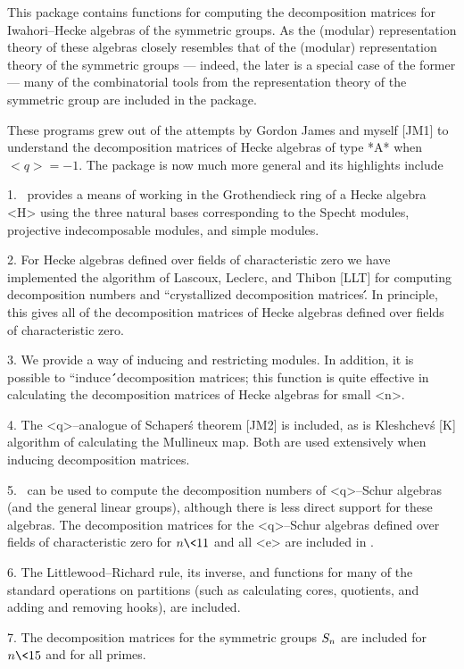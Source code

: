 This package contains functions for computing the decomposition matrices 
for Iwahori--Hecke algebras of the symmetric groups. As the (modular) 
representation theory of these algebras closely resembles that of the 
(modular) representation theory of the symmetric groups --- indeed, the 
later is a special case of the former --- many of the combinatorial tools 
from the representation theory of the symmetric group are included in 
the package.

These programs grew out of the attempts by Gordon James and myself [JM1] 
to understand the decomposition matrices of Hecke algebras of type *A* 
when $<q>=-1$. The package is now much more general and its highlights 
include\:

  1. \Specht\ provides a means of working in the Grothendieck ring of a 
Hecke algebra <H> using the three natural bases corresponding to the 
Specht modules, projective indecomposable modules, and simple modules.

  2. For Hecke algebras defined over fields of characteristic zero we 
have implemented the algorithm of Lascoux, Leclerc, and Thibon [LLT] for 
computing decomposition numbers and ``crystallized decomposition
matrices\'\'. In principle, this gives all of the decomposition matrices 
of Hecke algebras defined over fields of characteristic zero.

  3. We provide a way of inducing and restricting modules. In addition,
it is possible to ``induce\'\'\ decomposition matrices; this function is 
quite effective in calculating the decomposition matrices of Hecke 
algebras for small <n>.

  4. The <q>--analogue of Schaper\'s theorem [JM2] is included, as is
Kleshchev\'s [K] algorithm of calculating the Mullineux map. Both are
used extensively when inducing decomposition matrices.

  5. \Specht\ can be used to compute the decomposition numbers of
<q>--Schur algebras (and the general linear groups), although there is
less direct support for these algebras. The decomposition matrices for the
<q>--Schur algebras defined over fields of characteristic zero for $n\<11$
and all <e> are included in \Specht.

  6. The Littlewood--Richard rule, its inverse, and functions for many 
of the standard operations on partitions (such as calculating cores, 
quotients, and adding and removing hooks), are included.

  7. The decomposition matrices for the symmetric groups $S_n$ are
included for $n\<15$ and for all primes.

